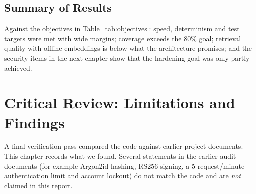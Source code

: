 \documentclass[openany]{tietreport}
\begin{document}
\section{Summary of Results}
Against the objectives in Table~\ref{tab:objectives}: speed, determinism and test targets were met with wide margins; coverage exceeds the 80\% goal; retrieval quality with offline embeddings is below what the architecture promises; and the security items in the next chapter show that the hardening goal was only partly achieved.

\chapter{Critical Review: Limitations and Findings}
\label{sec:limits}
A final verification pass compared the code against earlier project documents. This chapter records what we found. Several statements in the earlier audit documents (for example Argon2id hashing, RS256 signing, a 5-request/minute authentication limit and account lockout) do not match the code and are \emph{not} claimed in this report.
\end{document}
